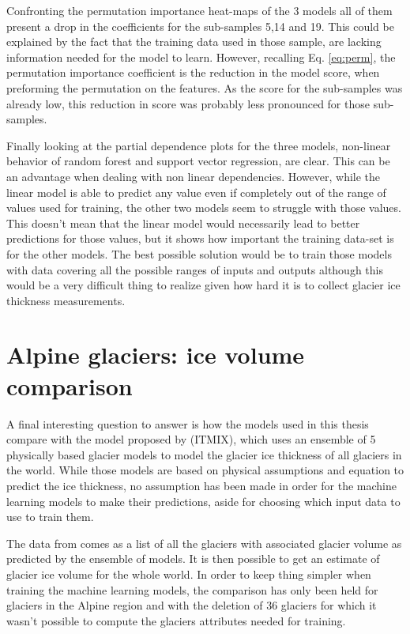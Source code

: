 Confronting the permutation importance heat-maps of the 3 models all of them present a drop in the coefficients for the sub-samples 5,14 and 19. This could be explained by the fact that the training data used in those sample, are lacking information needed for the model to learn. However, recalling Eq. \ref{eq:perm}, the permutation importance coefficient is the reduction in the model score, when preforming the permutation on the features. As the score for the sub-samples was already low, this reduction in score was probably less pronounced for those sub-samples. 

Finally looking at the partial dependence plots for the three models, non-linear behavior of random forest and support vector regression, are clear. This can be an advantage when dealing with non linear dependencies. However, while the linear model is able to predict any value even if completely out of the range of values used for training, the other two models seem to struggle with those values. This doesn't mean that the linear model would necessarily lead to better predictions for those values, but it shows how important the training data-set is for the other models. The best possible solution would be to train those models with data covering all the possible ranges of inputs and outputs although this would be a very difficult thing to realize given how hard it is to collect glacier ice thickness measurements.

\section{Alpine glaciers: ice volume comparison}\label{disc-alps}
A final interesting question to answer is how the models used in this thesis compare with the model proposed by \citet{Farinotti2019} (ITMIX), which uses an ensemble of 5 physically based glacier models to model the glacier ice thickness of all glaciers in the world. While those models are based on physical assumptions and  equation to predict the ice thickness, no assumption has been made in order for the machine learning models to make their predictions, aside for choosing which input data to use to train them.
 
The data from \citet{Farinotti2019} comes as a list of all the glaciers with associated glacier volume as predicted by the ensemble of models. It is then possible to get an estimate of glacier ice volume for the whole world.
In order to keep thing simpler when training the machine learning models, the comparison has only been held for glaciers in the Alpine region and with the deletion of 36 glaciers for which it wasn't possible to compute the glaciers attributes needed for training.

